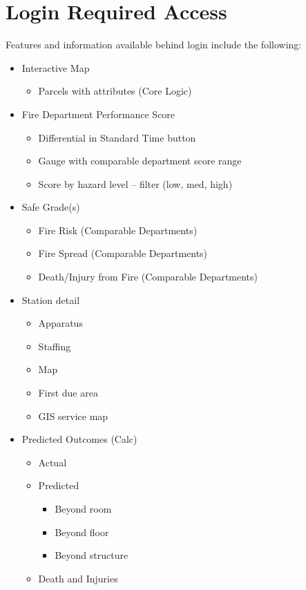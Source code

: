 \documentclass[12pt,oneside]{book}
\begin{document}
\chapter{Login Required Access}
Features and information available behind login include the following:
\begin{itemize}[noitemsep]
\item Interactive Map
  \begin{itemize}[noitemsep]
  \item Parcels with attributes (Core Logic)
  \end{itemize}
\item Fire Department Performance Score
  \begin{itemize}[noitemsep]
  \item Differential in Standard Time button
  \item Gauge with comparable department score range
  \item Score by hazard level – filter (low, med, high)
  \end{itemize}
\item Safe Grade(s)
  \begin{itemize}[noitemsep]
  \item Fire Risk (Comparable Departments)
  \item Fire Spread (Comparable Departments)
  \item Death/Injury from Fire (Comparable Departments)
  \end{itemize}
\item Station detail
  \begin{itemize}[noitemsep]
  \item Apparatus
  \item Staffing
  \item Map
  \item First due area
  \item GIS service map
  \end{itemize}
\item Predicted Outcomes (Calc)
  \begin{itemize}[noitemsep]
  \item Actual
  \item Predicted
    \begin{itemize}[noitemsep]
    \item Beyond room
    \item Beyond floor
    \item Beyond structure
    \end{itemize}
  \item Death and Injuries

\end{itemize}
\end{itemize}
\end{document}

